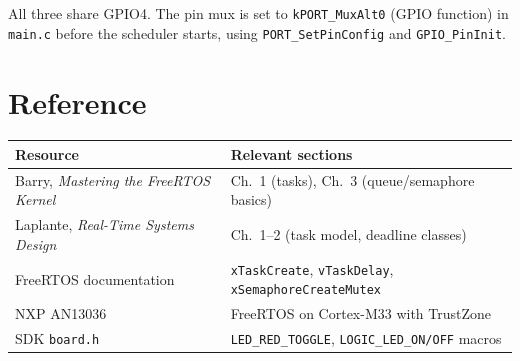 \documentclass[11pt, a4paper]{article}
\newcommand{\file}[1]{\texttt{\small #1}}
\newcommand{\api}[1]{\texttt{\small #1}}
\begin{document}
\medskip
All three share GPIO4. The pin mux is set to \texttt{kPORT\_MuxAlt0}
(GPIO function) in \file{main.c} before the scheduler starts,
using \api{PORT\_SetPinConfig} and \api{GPIO\_PinInit}.

\section{Reference}

\begin{tabular}{@{} p{6.5cm} p{7cm} @{}}
  \toprule
  \textbf{Resource} & \textbf{Relevant sections} \\
  \midrule
  Barry, \textit{Mastering the FreeRTOS Kernel}
    & Ch.~1 (tasks), Ch.~3 (queue/semaphore basics) \\
  Laplante, \textit{Real-Time Systems Design}
    & Ch.~1--2 (task model, deadline classes) \\
  FreeRTOS documentation
    & \api{xTaskCreate}, \api{vTaskDelay}, \api{xSemaphoreCreateMutex} \\
  NXP AN13036
    & FreeRTOS on Cortex-M33 with TrustZone \\
  SDK \file{board.h}
    & \api{LED\_RED\_TOGGLE}, \api{LOGIC\_LED\_ON/OFF} macros \\
  \bottomrule
\end{tabular}
\end{document}
